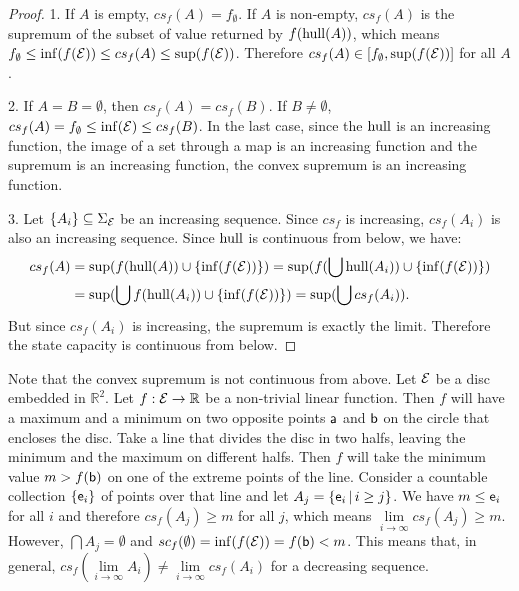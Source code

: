 \begin{mathSection}
\begin{proof}
	1. If $A$ is empty, $cs_f(A) = f_{\emptyset}$. If $A$ is non-empty, $cs_f(A)$ is the supremum of the subset of value returned by $f(\hull(A))$, which means $f_{\emptyset} \leq \inf(f(\Ens)) \leq cs_f(A) \leq \sup(f(\Ens))$. Therefore $cs_f(A) \in [f_{\emptyset}, \sup(f(\Ens))]$ for all $A$.

	2. If $A = B = \emptyset$, then $cs_f(A) = cs_f(B)$. If $B \neq \emptyset$, $cs_f(A) = f_{\emptyset} \leq \inf(\Ens) \leq cs_f(B)$. In the last case, since the $\hull$ is an increasing function, the image of a set through a map is an increasing function and the supremum is an increasing function, the convex supremum is an increasing function.
	
	3. Let $\{A_i\} \subseteq \Sigma_{\Ens}$ be an increasing sequence. Since $cs_f$ is increasing, $cs_f(A_i)$ is also an increasing sequence. Since $\hull$ is continuous from below, we have:
	\begin{equation}
		\begin{aligned}
			cs_f(A) &= \sup(f(\hull(A))\cup\{\inf(f(\Ens))\}) = \sup(f(\bigcup\hull(A_i))\cup\{\inf(f(\Ens))\})\\
			&= \sup(\bigcup f(\hull(A_i))\cup\{\inf(f(\Ens))\}) = \sup(\bigcup cs_f(A_i)).
		\end{aligned}
	\end{equation}
	But since $cs_f(A_i)$ is increasing, the supremum is exactly the limit. Therefore the state capacity is continuous from below.
\end{proof}

\begin{remark}
	Note that the convex supremum is not continuous from above. Let $\Ens$ be a disc embedded in $\mathbb{R}^2$. Let $f : \Ens \to \mathbb{R}$ be a non-trivial linear function. Then $f$ will have a maximum and a minimum on two opposite points $\ens[a]$ and $\ens[b]$ on the circle that encloses the disc. Take a line that divides the disc in two halfs, leaving the minimum and the maximum on different halfs. Then $f$ will take the minimum value $m > f(\ens[b])$ on one of the extreme points of the line. Consider a countable collection $\{\ens_i\}$ of points over that line and let $A_j = \{ \ens_i \, | \, i \geq j \}$.  We have $m \leq \ens_i$ for all $i$ and therefore $cs_f(A_j) \geq m$ for all $j$, which means $\lim\limits_{i \to \infty} cs_f(A_j) \geq m$. However, $\bigcap A_j = \emptyset$ and $sc_f(\emptyset) = \inf(f(\Ens)) = f(\ens[b]) < m$. This means that, in general, $cs_f(\lim\limits_{i \to \infty} A_i) \neq \lim\limits_{i \to \infty} cs_f(A_i)$ for a decreasing sequence.
\end{remark}


\end{mathSection}
